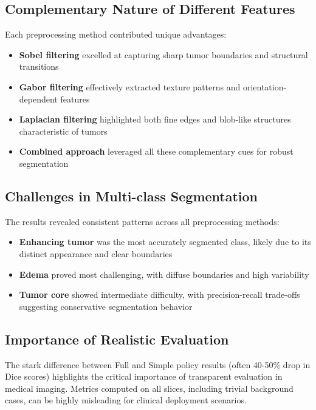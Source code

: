 \subsection{Complementary Nature of Different Features}

Each preprocessing method contributed unique advantages:
\begin{itemize}
    \item \textbf{Sobel filtering} excelled at capturing sharp tumor boundaries and structural transitions
    \item \textbf{Gabor filtering} effectively extracted texture patterns and orientation-dependent features
    \item \textbf{Laplacian filtering} highlighted both fine edges and blob-like structures characteristic of tumors
    \item \textbf{Combined approach} leveraged all these complementary cues for robust segmentation
\end{itemize}

\subsection{Challenges in Multi-class Segmentation}

The results revealed consistent patterns across all preprocessing methods:
\begin{itemize}
    \item \textbf{Enhancing tumor} was the most accurately segmented class, likely due to its distinct appearance and clear boundaries
    \item \textbf{Edema} proved most challenging, with diffuse boundaries and high variability
    \item \textbf{Tumor core} showed intermediate difficulty, with precision-recall trade-offs suggesting conservative segmentation behavior
\end{itemize}

\subsection{Importance of Realistic Evaluation}

The stark difference between Full and Simple policy results (often 40-50\% drop in Dice scores) highlights the critical importance of transparent evaluation in medical imaging. Metrics computed on all slices, including trivial background cases, can be highly misleading for clinical deployment scenarios.

